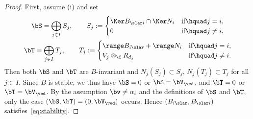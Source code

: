 \begin{proof}
First, assume (i) and set
\begin{gather*}
\bS =\bigoplus_{j\in I} S_j, \qquad
S_j :=
\begin{cases}
\Ker B_{\slar i} \cap \Ker N_i & \text{if}\hquad j=i, \\
0 & \text{if}\hquad j \neq i,
\end{cases} \\
\bT =\bigoplus_{j\in I} T_j, \qquad
T_j :=
\begin{cases}
\range B_{i \slar} + \range N_i & \text{if}\hquad j=i, \\
V_j \otimes_\C R_{d_j} & \text{if}\hquad j \neq i.
\end{cases}
\end{gather*}
Then both $\bS$ and $\bT$ are $B$-invariant and
$N_j(S_j) \subset S_j,\, N_j(T_j) \subset T_j$ for all $j \in I$.
Since $B$ is stable,
we thus have $\bS =0$ or $\bS=\bV_\ved$,
and $\bT=0$ or $\bT=\bV_\ved$.
By the assumption $\bv \neq \alpha_i$ and the def\/initions of $\bS$ and $\bT$,
only the case $(\bS,\bT)=(0,\bV_\ved)$ occurs.
Hence $(B_{i \slar},B_{\slar i})$ satisf\/ies~\eqref{eq:stability}.


\end{proof}
